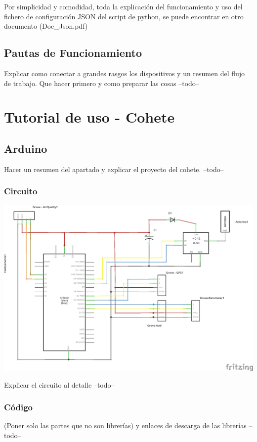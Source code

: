 \documentclass[12pt, a4paper, oneside, titlepage]{article}
\begin{document}
Por simplicidad y comodidad, toda la explicación del funcionamiento y uso del fichero de configuración JSON del script de python, se puede encontrar en otro documento (Doc\_Json.pdf) 


\subsection{Pautas de Funcionamiento}
Explicar como conectar a grandes rasgos los dispositivos y un resumen del flujo de trabajo.
Que hacer primero y como preparar las cosas
--todo--


\section{Tutorial de uso - Cohete}

\subsection{Arduino}

Hacer un resumen del apartado y explicar el proyecto del cohete.
--todo--


\subsubsection{Circuito}

\includegraphics[width=0.9\linewidth,keepaspectratio]{img/RocketSketch_schem.jpg}

Explicar el circuito al detalle
--todo--


\subsubsection{Código}
(Poner solo las partes que no son librerías) y enlaces de descarga de las librerías
--todo--
\end{document}
